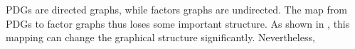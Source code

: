 \documentclass[letterpaper]{article} %
\theoremstyle{plain}
\theoremstyle{definition}
\theoremstyle{remark}
\newcommand\vfull[1]{{\color{vfullcolor} #1}}
\renewcommand\vfull[1]{} %
\begin{document}
PDGs are directed graphs, while factors graphs are undirected. The
map from PDGs to factor graphs thus loses some important structure.
As shown in
\vfull{
    \Cref{fig:fg2PDG,fig:fg-intro-examples}
}%
,
this mapping can change the graphical structure significantly.
Nevertheless,
\end{document}
